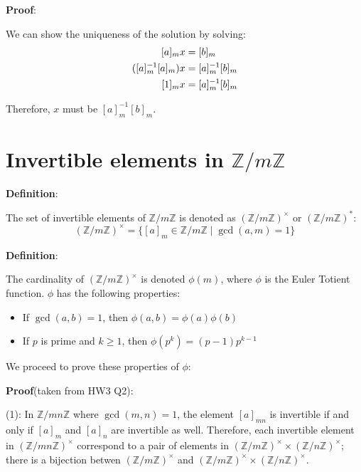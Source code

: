 \documentclass{article}
\begin{document}
\begin{multicols*}{2}
\textbf{Proof}:

We can show the uniqueness of the solution by solving:\[\begin{aligned} \relax
    [a]_m x &= [b]_m\\
    ([a]^{-1}_m[a]_m) x &= [a]^{-1}_m[b]_m\\
    [1]_m x &= [a]^{-1}_m[b]_m\\
\end{aligned}\]

Therefore, $x$ must be $[a]^{-1}_m[b]_m$.

\section{Invertible elements in $\mathbb{Z}/m\mathbb{Z}$}

\textbf{Definition}:

The set of invertible elements of $\mathbb{Z}/m\mathbb{Z}$ is denoted as $(\mathbb{Z}/m\mathbb{Z})^\times$ or $(\mathbb{Z}/m\mathbb{Z})^*$: \[(\mathbb{Z}/m\mathbb{Z})^\times = \{[a]_m \in \mathbb{Z}/m\mathbb{Z}\;|\; \gcd(a,m) = 1\}\]

\textbf{Definition}:

The cardinality of $(\mathbb{Z}/m\mathbb{Z})^\times$ is denoted $\phi(m)$, where $\phi$ is the Euler Totient function. $\phi$ has the following properties:
\begin{itemize}
    \item[(1)] If $\gcd(a, b) = 1$, then $\phi(a,b) = \phi(a)\phi(b)$
    \item[(2)] If $p$ is prime and $k \geq 1$, then $\phi(p^k) = (p-1)p^{k-1}$
\end{itemize}

We proceed to prove these properties of $\phi$:

\textbf{Proof}(taken from HW3 Q2):

(1): In $\mathbb{Z}/mn\mathbb{Z}$ where $\gcd(m,n) = 1$, the element $[a]_{mn}$ is invertible if and only if $[a]_m$ and $[a]_n$ are invertible as well. Therefore, each invertible element in $(\mathbb{Z}/mn\mathbb{Z})^\times$ correspond to a pair of elements in $(\mathbb{Z}/m\mathbb{Z})^\times \times (\mathbb{Z}/n\mathbb{Z})^\times$; there is a bijection betwen $(\mathbb{Z}/m\mathbb{Z})^\times$ and $(\mathbb{Z}/m\mathbb{Z})^\times \times (\mathbb{Z}/n\mathbb{Z})^\times$. 


\end{multicols*}
\end{document}
